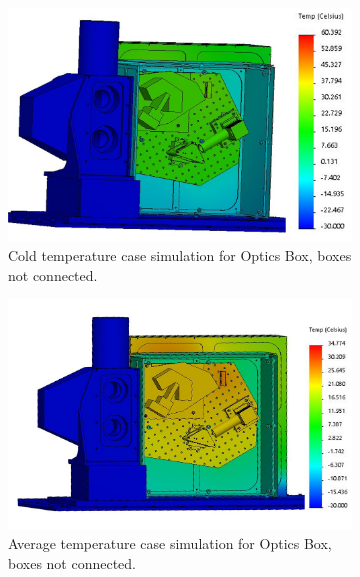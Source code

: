 \begin{figure}
    \centering
    \begin{subfigure}[h]{0.53\textwidth}
        \centering
        \includegraphics[width=\textwidth]{chap3_images/LIFE_V4_images/TA_Full_Model_Iter_10_FIXED.png}
        \caption{Cold temperature case simulation for Optics Box, boxes not connected.}
        \label{fig:LIFE_V4_TA_Optics_2a}
    \end{subfigure}
    \begin{subfigure}[h]{0.53\textwidth}
        \centering
        \includegraphics[width=\textwidth]{chap3_images/LIFE_V4_images/TA_Full_Model_Iter_11_FIXED.png}
        \caption{Average temperature case simulation for Optics Box, boxes not connected.}
        \label{fig:LIFE_V4_TA_Optics_2b}
    \end{subfigure}
    \begin{subfigure}[h]{0.53\textwidth}

\end{subfigure}
\end{figure}
